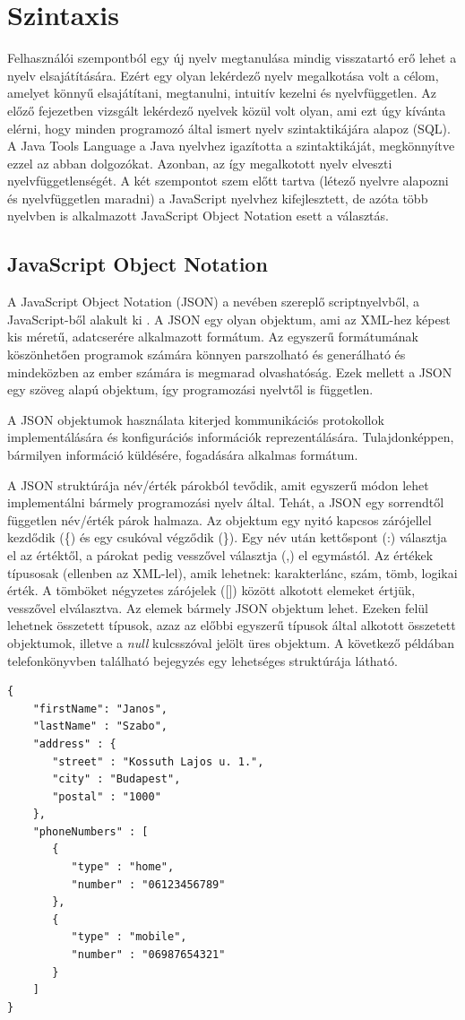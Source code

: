 \documentclass[a4paper,12pt]{report}
\begin{document}
\section{Szintaxis}
Felhasználói szempontból egy új nyelv megtanulása mindig visszatartó erő lehet a nyelv elsajátítására. Ezért egy olyan lekérdező nyelv megalkotása volt a célom, amelyet könnyű elsajátítani, megtanulni, intuitív kezelni és nyelvfüggetlen. Az előző fejezetben vizsgált lekérdező nyelvek közül volt olyan, ami ezt úgy kívánta elérni, hogy minden programozó által ismert nyelv szintaktikájára alapoz (SQL). A Java Tools Language a Java nyelvhez igazította a szintaktikáját, megkönnyítve ezzel az abban dolgozókat. Azonban, az így megalkotott nyelv elveszti nyelvfüggetlenségét. A két szempontot szem előtt tartva (létező nyelvre alapozni és nyelvfüggetlen maradni) a JavaScript nyelvhez kifejlesztett, de azóta több nyelvben is alkalmazott JavaScript Object Notation esett a választás.
\subsection{JavaScript Object Notation}
A JavaScript Object Notation (JSON) a nevében szereplő scriptnyelvből, a JavaScript-ből alakult ki \cite{json}. A JSON egy olyan objektum, ami az XML-hez képest kis méretű, adatcserére alkalmazott formátum. Az egyszerű formátumának köszönhetően programok számára könnyen parszolható és generálható és mindeközben az ember számára is megmarad olvashatóság. Ezek mellett a JSON egy szöveg alapú objektum, így programozási nyelvtől is független.
\par A JSON objektumok használata kiterjed kommunikációs protokollok implementálására és konfigurációs információk reprezentálására. Tulajdonképpen, bármilyen információ küldésére, fogadására alkalmas formátum.
\par A JSON struktúrája név/érték párokból tevődik, amit egyszerű módon lehet implementálni bármely programozási nyelv által. Tehát, a JSON egy sorrendtől független név/érték párok halmaza. Az objektum egy nyitó kapcsos zárójellel kezdődik (\{) és egy csukóval végződik (\}). Egy név után kettőspont (:) választja el az értéktől, a párokat pedig vesszővel választja (,) el egymástól. Az értékek típusosak (ellenben az XML-lel), amik lehetnek: karakterlánc, szám, tömb, logikai érték. A tömböket négyzetes zárójelek ([]) között alkotott elemeket értjük, vesszővel elválasztva. Az elemek bármely JSON objektum lehet. Ezeken felül lehetnek összetett típusok, azaz az előbbi egyszerű típusok által alkotott összetett objektumok, illetve a \textit{null} kulcsszóval jelölt üres objektum. A következő példában telefonkönyvben található bejegyzés egy lehetséges struktúrája látható.
\begin{verbatim}
{
    "firstName": "Janos",
    "lastName" : "Szabo",
    "address" : {
       "street" : "Kossuth Lajos u. 1.",
       "city" : "Budapest",
       "postal" : "1000"
    },
    "phoneNumbers" : [
       {
          "type" : "home",
          "number" : "06123456789"
       },
       {
          "type" : "mobile",
          "number" : "06987654321"
       }
    ]
}
\end{verbatim}
\end{document}
